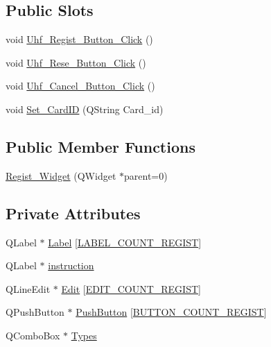 \subsection*{Public Slots}
\begin{DoxyCompactItemize}
\item 
void \mbox{\hyperlink{class_regist___widget_ad9bd1660e89ca91615deb86a9e8a44c3}{Uhf\+\_\+\+Regist\+\_\+\+Button\+\_\+\+Click}} ()
\item 
void \mbox{\hyperlink{class_regist___widget_ab97ea654f98bb920f7777ed2a7495ced}{Uhf\+\_\+\+Rese\+\_\+\+Button\+\_\+\+Click}} ()
\item 
void \mbox{\hyperlink{class_regist___widget_a6f3346a433ac1b4c3aa57ace03b4ac1d}{Uhf\+\_\+\+Cancel\+\_\+\+Button\+\_\+\+Click}} ()
\item 
void \mbox{\hyperlink{class_regist___widget_a1493d37070ac8d626fafa8239be147a7}{Set\+\_\+\+Card\+ID}} (Q\+String Card\+\_\+id)
\end{DoxyCompactItemize}
\subsection*{Public Member Functions}
\begin{DoxyCompactItemize}
\item 
\mbox{\hyperlink{class_regist___widget_a33b39fa0b699001b9e41cd91ae7ea4ec}{Regist\+\_\+\+Widget}} (Q\+Widget $\ast$parent=0)
\end{DoxyCompactItemize}
\subsection*{Private Attributes}
\begin{DoxyCompactItemize}
\item 
Q\+Label $\ast$ \mbox{\hyperlink{class_regist___widget_a73e4b5f46a7ad046ae33f935b4fd3b46}{Label}} \mbox{[}\mbox{\hyperlink{regist__widget_8h_a6a4fa301fef4592554a274b47ca75bab}{L\+A\+B\+E\+L\+\_\+\+C\+O\+U\+N\+T\+\_\+\+R\+E\+G\+I\+ST}}\mbox{]}
\item 
Q\+Label $\ast$ \mbox{\hyperlink{class_regist___widget_ac21f8a7a1a6acd7f43f93ed5ac133681}{instruction}}
\item 
Q\+Line\+Edit $\ast$ \mbox{\hyperlink{class_regist___widget_a837bd4d13a2230e1569e8f6745733f97}{Edit}} \mbox{[}\mbox{\hyperlink{regist__widget_8h_a10687a6d03383b36267ecd51b82e2d4e}{E\+D\+I\+T\+\_\+\+C\+O\+U\+N\+T\+\_\+\+R\+E\+G\+I\+ST}}\mbox{]}
\item 
Q\+Push\+Button $\ast$ \mbox{\hyperlink{class_regist___widget_acb1651371b04b2020df957386cd92f66}{Push\+Button}} \mbox{[}\mbox{\hyperlink{regist__widget_8h_a2e0586e9b6994b0bc0688ed11bbc7eba}{B\+U\+T\+T\+O\+N\+\_\+\+C\+O\+U\+N\+T\+\_\+\+R\+E\+G\+I\+ST}}\mbox{]}
\item 
Q\+Combo\+Box $\ast$ \mbox{\hyperlink{class_regist___widget_a4d510f05b4b33c36c40c01601e120775}{Types}}
\end{DoxyCompactItemize}


